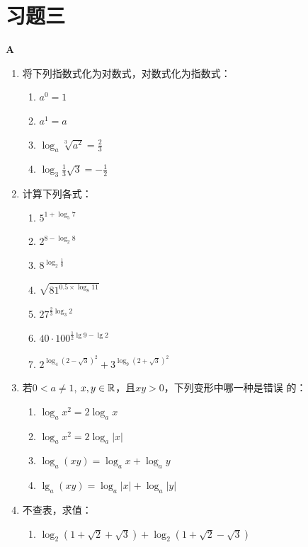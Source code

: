 \section*{习题三}
\begin{center}
    \bfseries A
\end{center}
\begin{enumerate}
    \item 将下列指数式化为对数式，对数式化为指数式：
\begin{multicols}{2}
\begin{enumerate}[(1)]
    \item $a^0=1$
    \item $a^1=a$
    \item $\log_a\sqrt[3]{a^2}=\frac{2}{3}$
    \item $\log_3\frac{1}{3}\sqrt{3}=-\frac{1}{2}$
\end{enumerate}
\end{multicols}
    \item 计算下列各式：
\begin{multicols}{2}
\begin{enumerate}[(1)]
    \item $5^{1+\log_5 7}$
    \item $2^{8-\log_2 8}$
    \item $8^{\log_2\frac{1}{8}}$
    \item $\sqrt{81^{0.5\times \log_8 11}}$
    \item $27^{\tfrac{2}{3}\log_3 2}$
    \item $40\cdot 100^{\tfrac{1}{2}\lg 9-\lg 2}$
    \item $2^{\log_4\left(2-\sqrt{3}\right)^2}+3^{\log_9\left(2+\sqrt{3}\right)^2}$
\end{enumerate}
\end{multicols}
    \item 若$0<a\ne 1$, $x,y\in\mathbb{R}$，且$xy>0$，下列变形中哪一种是错误
的：
\begin{multicols}{2}
    \begin{enumerate}[(1)]
\item $\log_a x^2=2\log_a x$
\item $\log_a x^2 = 2\log_a |x|$
\item $\log_a (xy)=\log_a x+\log_a y$
\item $\lg_a (xy)=\log_a|x|+ \log_a|y| $
    \end{enumerate}
\end{multicols}
\item 不查表，求值：
    \begin{enumerate}[(1)]
\item $\log_2 (1+\sqrt{2}+\sqrt{3})+\log_2 (1+\sqrt{2}-\sqrt{3})$
    \end{enumerate}


\end{enumerate}
